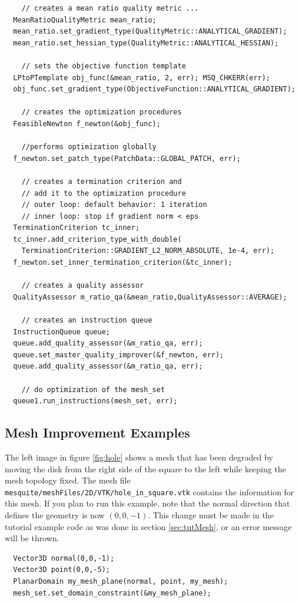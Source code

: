 \begin{verbatim}
    // creates a mean ratio quality metric ...
  MeanRatioQualityMetric mean_ratio;
  mean_ratio.set_gradient_type(QualityMetric::ANALYTICAL_GRADIENT);
  mean_ratio.set_hessian_type(QualityMetric::ANALYTICAL_HESSIAN);

    // sets the objective function template
  LPtoPTemplate obj_func(&mean_ratio, 2, err); MSQ_CHKERR(err);
  obj_func.set_gradient_type(ObjectiveFunction::ANALYTICAL_GRADIENT);
  
    // creates the optimization procedures
  FeasibleNewton f_newton(&obj_func);

    //performs optimization globally
  f_newton.set_patch_type(PatchData::GLOBAL_PATCH, err); 

    // creates a termination criterion and 
    // add it to the optimization procedure
    // outer loop: default behavior: 1 iteration
    // inner loop: stop if gradient norm < eps
  TerminationCriterion tc_inner;
  tc_inner.add_criterion_type_with_double(
    TerminationCriterion::GRADIENT_L2_NORM_ABSOLUTE, 1e-4, err); 
  f_newton.set_inner_termination_criterion(&tc_inner);

    // creates a quality assessor
  QualityAssessor m_ratio_qa(&mean_ratio,QualityAssessor::AVERAGE);

    // creates an instruction queue
  InstructionQueue queue;
  queue.add_quality_assessor(&m_ratio_qa, err); 
  queue.set_master_quality_improver(&f_newton, err); 
  queue.add_quality_assessor(&m_ratio_qa, err); 

    // do optimization of the mesh_set
  queue1.run_instructions(mesh_set, err); 
\end{verbatim} 

\subsection{Mesh Improvement Examples}

The left image in figure \ref{fig:hole} shows a mesh that has
been degraded by moving the disk from the right side of the square to
the left while keeping the mesh topology fixed.
The mesh file
\texttt{mesquite/meshFiles/2D/VTK/hole\_in\_square.vtk} contains the
information for this mesh.  If you plan to run this example, note that
the normal direction that defines the geometry is now $(0,0,-1)$.
This change must be made in the tutorial example code
as was done in section \ref{sec:tutMesh}, or an error message will be
thrown.
\begin{verbatim}
  Vector3D normal(0,0,-1);
  Vector3D point(0,0,-5);
  PlanarDomain my_mesh_plane(normal, point, my_mesh);
  mesh_set.set_domain_constraint(&my_mesh_plane);
\end{verbatim}

